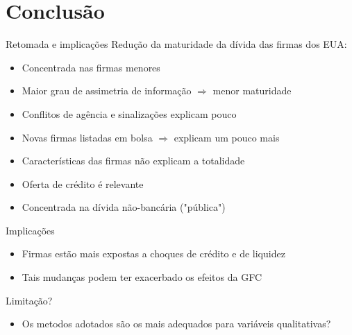 \documentclass[presentation]{beamer}
\begin{document}
\section{Conclusão}
\label{sec:org02099e4}
\begin{frame}[label={sec:org4d9c50b}]{Retomada e implicações}
Redução da maturidade da dívida das firmas dos EUA:
\begin{itemize}
\item Concentrada nas firmas menores
\item Maior grau de assimetria de informação \(\Rightarrow\) menor maturidade
\item Conflitos de agência e sinalizações explicam pouco
\item Novas firmas listadas em bolsa \(\Rightarrow\) explicam um pouco mais
\item Características das firmas não explicam a totalidade
\item Oferta de crédito é relevante
\item Concentrada na dívida não-bancária ("pública")
\end{itemize}

\begin{block}{Implicações}
\begin{itemize}
\item Firmas estão mais expostas a choques de crédito e de liquidez
\item Tais mudanças podem ter exacerbado os efeitos da GFC
\end{itemize}
\end{block}

\begin{block}{Limitação?}
\begin{itemize}
\item Os metodos adotados são os mais adequados para variáveis qualitativas?
\end{itemize}
\end{block}
\end{frame}
\end{document}
